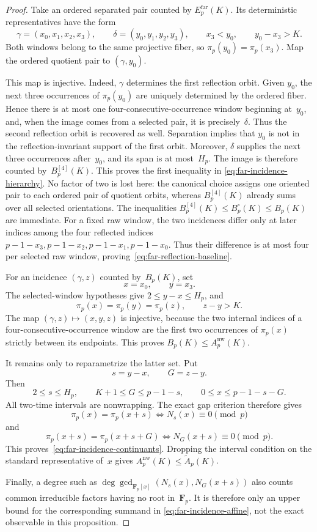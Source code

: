 \begin{proof}
Take an ordered separated pair counted by
$E_p^{\mathrm{far}}(K)$.  Its deterministic representatives have the form
\[
 \gamma=(x_0,x_1,x_2,x_3),\qquad
 \delta=(y_0,y_1,y_2,y_3),
 \qquad x_3<y_0,\qquad y_0-x_3>K.
\]
Both windows belong to the same projective fiber, so
$\pi_p(y_0)=\pi_p(x_3)$.  Map the ordered quotient pair to
$(\gamma,y_0)$.

This map is injective.  Indeed, $\gamma$ determines the first reflection
orbit.  Given $y_0$, the next three occurrences of
$\pi_p(y_0)$ are uniquely determined by the ordered fiber.  Hence there is
at most one four-consecutive-occurrence window beginning at~$y_0$, and, when
the image comes from a selected pair, it is precisely~$\delta$.  Thus the
second reflection orbit is recovered as well.  Separation implies that
$y_0$ is not in the reflection-invariant support of the first orbit.
Moreover, $\delta$ supplies the next three occurrences after~$y_0$, and its
span is at most~$H_p$.  The image is therefore counted by~$B_p^{[4]}(K)$.
This proves the first inequality in
\eqref{eq:far-incidence-hierarchy}.  No factor of two is lost here: the
canonical choice assigns one oriented pair to each ordered pair of quotient
orbits, whereas $B_p^{[4]}(K)$ already sums over all selected orientations.
The inequalities $B_p^{[4]}(K)\le B_p^\circ(K)\le B_p(K)$ are immediate.
For a fixed raw window, the two incidences differ only at later indices among
the four reflected indices
$p-1-x_3,p-1-x_2,p-1-x_1,p-1-x_0$.  Thus their difference is at most four
per selected raw window, proving~\eqref{eq:far-reflection-baseline}.

For an incidence $(\gamma,z)$ counted by~$B_p(K)$, set
\[
 x=x_0,\qquad y=x_3.
\]
The selected-window hypotheses give
$2\le y-x\le H_p$, and
\[
 \pi_p(x)=\pi_p(y)=\pi_p(z),\qquad z-y>K.
\]
The map $(\gamma,z)\mapsto(x,y,z)$ is injective, because the two internal
indices of a four-consecutive-occurrence window are the first two
occurrences of $\pi_p(x)$ strictly between its endpoints.  This proves
$B_p(K)\le A_p^{\mathrm{nw}}(K)$.

It remains only to reparametrize the latter set.  Put
\[
 s=y-x,\qquad G=z-y.
\]
Then
\[
 2\le s\le H_p,\qquad K+1\le G\le p-1-s,\qquad
 0\le x\le p-1-s-G.
\]
All two-time intervals are nonwrapping.  The exact gap criterion therefore
gives
\[
 \pi_p(x)=\pi_p(x+s)
 \iff N_s(x)\equiv0\pmod p
\]
and
\[
 \pi_p(x+s)=\pi_p(x+s+G)
 \iff N_G(x+s)\equiv0\pmod p.
\]
This proves~\eqref{eq:far-incidence-continuants}.  Dropping the interval
condition on the standard representative of~$x$ gives
$A_p^{\mathrm{nw}}(K)\le\widetilde A_p(K)$.

Finally, a degree such as
$\deg\gcd_{\mathbf F_p[x]}(N_s(x),N_G(x+s))$ also counts common irreducible
factors having no root in~$\mathbf F_p$.  It is therefore only an upper
bound for the corresponding summand in
\eqref{eq:far-incidence-affine}, not the exact observable in this
proposition.
\end{proof}

